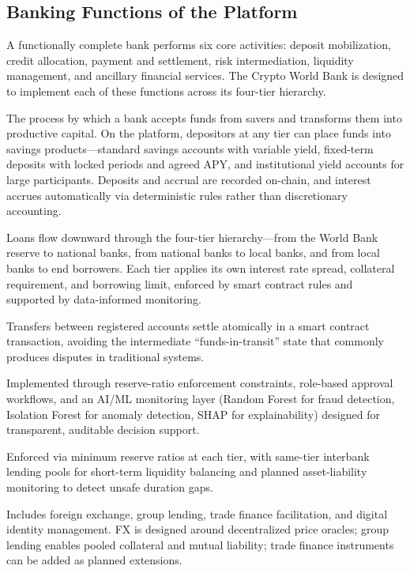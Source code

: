 \documentclass[12pt,a4paper]{report}
\begin{document}
\subsection{Banking Functions of the Platform}

A functionally complete bank performs six core activities: deposit mobilization, credit allocation, payment and settlement, risk intermediation, liquidity management, and ancillary financial services. The Crypto World Bank is designed to implement each of these functions across its four-tier hierarchy.

\begin{description}[leftmargin=0pt]
\item[\textbf{Deposit Mobilization.}] The process by which a bank accepts funds from savers and transforms them into productive capital. On the platform, depositors at any tier can place funds into savings products---standard savings accounts with variable yield, fixed-term deposits with locked periods and agreed APY, and institutional yield accounts for large participants. Deposits and accrual are recorded on-chain, and interest accrues automatically via deterministic rules rather than discretionary accounting.
\item[\textbf{Credit Allocation.}] Loans flow downward through the four-tier hierarchy---from the World Bank reserve to national banks, from national banks to local banks, and from local banks to end borrowers. Each tier applies its own interest rate spread, collateral requirement, and borrowing limit, enforced by smart contract rules and supported by data-informed monitoring.
\item[\textbf{Payment and Settlement.}] Transfers between registered accounts settle atomically in a smart contract transaction, avoiding the intermediate ``funds-in-transit'' state that commonly produces disputes in traditional systems.
\item[\textbf{Risk Intermediation.}] Implemented through reserve-ratio enforcement constraints, role-based approval workflows, and an AI/ML monitoring layer (Random Forest for fraud detection, Isolation Forest for anomaly detection, SHAP for explainability) designed for transparent, auditable decision support.
\item[\textbf{Liquidity Management.}] Enforced via minimum reserve ratios at each tier, with same-tier interbank lending pools for short-term liquidity balancing and planned asset-liability monitoring to detect unsafe duration gaps.
\item[\textbf{Ancillary Financial Services.}] Includes foreign exchange, group lending, trade finance facilitation, and digital identity management. FX is designed around decentralized price oracles; group lending enables pooled collateral and mutual liability; trade finance instruments can be added as planned extensions.
\end{description}
\end{document}
